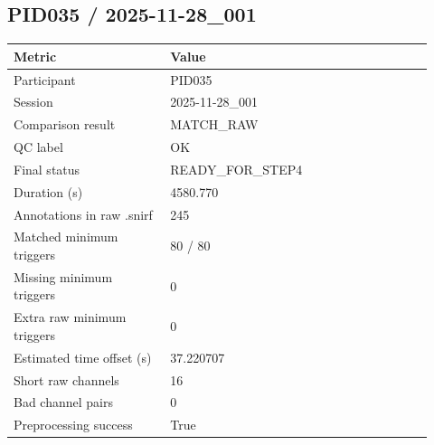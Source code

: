 \subsection*{PID035 / 2025-11-28\_001}
\begin{tabular}{p{0.34\linewidth}p{0.58\linewidth}}
\toprule
Metric & Value\\
\midrule
Participant & PID035\\
Session & 2025-11-28\_001\\
Comparison result & MATCH\_RAW\\
QC label & OK\\
Final status & READY\_FOR\_STEP4\\
Duration (s) & 4580.770\\
Annotations in raw .snirf & 245\\
Matched minimum triggers & 80 / 80\\
Missing minimum triggers & 0\\
Extra raw minimum triggers & 0\\
Estimated time offset (s) & 37.220707\\
Short raw channels & 16\\
Bad channel pairs & 0\\
Preprocessing success & True\\
\bottomrule
\end{tabular}

